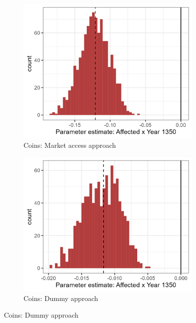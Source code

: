 \begin{figure}[h!]
    \centering
    \caption{Distribution of parameter estimates in 1350  (full sample)}
    \begin{subfigure}[b]{0.45\textwidth}
        \centering
        \caption{\label{fig:distri_a} Coins: Market access approach}
        \includegraphics[width=\textwidth]{Plots/Regression_plots/arch_MA_coins_boot_norm.png}
    \end{subfigure}
    \hfill
    \begin{subfigure}[b]{0.45\textwidth}
        \centering
        \caption{\label{fig:distri_b} Coins: Dummy approach}
        \includegraphics[width=\textwidth]{Plots/Regression_plots/arch_dummy_coins_boot_norm.png}

\end{subfigure}
\end{figure}
